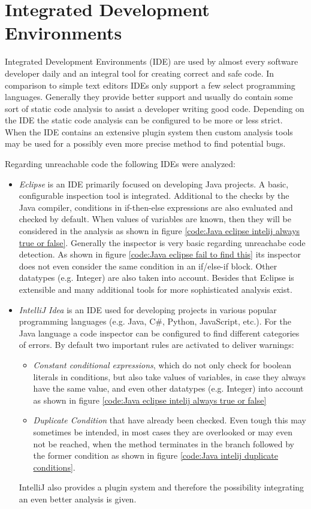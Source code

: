 \section{Integrated Development Environments}
\label{sec:intelliJ}
Integrated Development Environments (IDE) are used by almost every software developer daily and an integral tool for creating correct and safe code.
In comparison to simple text editors IDEs only support a few select programming languages. Generally they provide better support and usually do contain some sort of static code analysis to assist a developer writing good code. 
Depending on the IDE the static code analysis can be configured to be more or less strict. 
When the IDE contains an extensive plugin system then custom analysis tools may be used for a possibly even more precise method to find potential bugs.


Regarding unreachable code the following IDEs were analyzed:
\begin{itemize}
	\item \emph{Eclipse} \cite{incCommunityOpenInnovation} is an IDE primarily focused on developing Java projects. A basic, configurable inspection tool is integrated. Additional to the checks by the Java compiler, conditions in if-then-else expressions are also evaluated and checked by default. When values of variables are known, then they will be considered in the analysis as shown in figure \ref{code:Java eclipse intelij always true or false}. Generally the inspector is very basic regarding unreachabe code detection. As shown in figure \ref{code:Java eclipse fail to find this} its inspector does not even consider the same condition in an if/else-if block. Other datatypes (e.g. Integer) are also taken into account. Besides that Eclipse is extensible and many additional tools for more sophisticated analysis exist.
	\item \emph{IntelliJ Idea} \cite{IntelliJIDEACapable} is an IDE used for developing projects in various popular programming languages (e.g. Java, C\#, Python, JavaScript, etc.). For the Java language a code inspector can be configured to find different categories of errors. By default two important rules are activated to deliver warnings: 
	\begin{itemize}
		\item \emph{Constant conditional expressions}, which do not only check for boolean literals in conditions, but also take values of variables, in case they always have the same value, and even other datatypes (e.g. Integer) into account as shown in figure \ref{code:Java eclipse intelij always true or false}
		\item \emph{Duplicate Condition} that have already been checked. Even tough this may sometimes be intended, in most cases they are overlooked or may even not be reached, when the method terminates in the branch followed by the former condition as shown in figure \ref{code:Java intelij duplicate conditions}. 
	\end{itemize}
	IntelliJ also provides a plugin system and therefore the possibility integrating an even better analysis is given.
\end{itemize}

